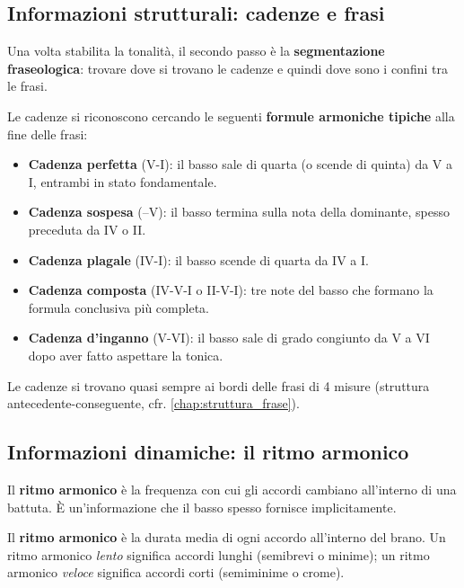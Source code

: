 \subsection{Informazioni strutturali: cadenze e frasi}

Una volta stabilita la tonalità, il secondo passo è la \textbf{segmentazione fraseologica}: trovare dove si trovano le cadenze e quindi dove sono i confini tra le frasi.

\begin{regola}
	\label{reg:riconoscimento_cadenze_basso}
	Le cadenze si riconoscono cercando le seguenti \textbf{formule armoniche tipiche} alla fine delle frasi:
	\begin{itemize}
		\item \textbf{Cadenza perfetta} (V-I): il basso sale di quarta (o scende di quinta) da V a I, entrambi in stato fondamentale.
		\item \textbf{Cadenza sospesa} (--V): il basso termina sulla nota della dominante, spesso preceduta da IV o II.
		\item \textbf{Cadenza plagale} (IV-I): il basso scende di quarta da IV a I.
		\item \textbf{Cadenza composta} (IV-V-I o II-V-I): tre note del basso che formano la formula conclusiva più completa.
		\item \textbf{Cadenza d'inganno} (V-VI): il basso sale di grado congiunto da V a VI dopo aver fatto aspettare la tonica.
	\end{itemize}
	Le cadenze si trovano quasi sempre ai bordi delle frasi di 4 misure (struttura antecedente-conseguente, cfr. \ref{chap:struttura_frase}).
\end{regola}

\subsection{Informazioni dinamiche: il ritmo armonico}

Il \textbf{ritmo armonico} è la frequenza con cui gli accordi cambiano all'interno di una battuta. È un'informazione che il basso spesso fornisce implicitamente.

\begin{definizione}
	\label{def:ritmo_armonico}
	Il \textbf{ritmo armonico} è la durata media di ogni accordo all'interno del brano. Un ritmo armonico \textit{lento} significa accordi lunghi (semibrevi o minime); un ritmo armonico \textit{veloce} significa accordi corti (semiminime o crome).
\end{definizione}

